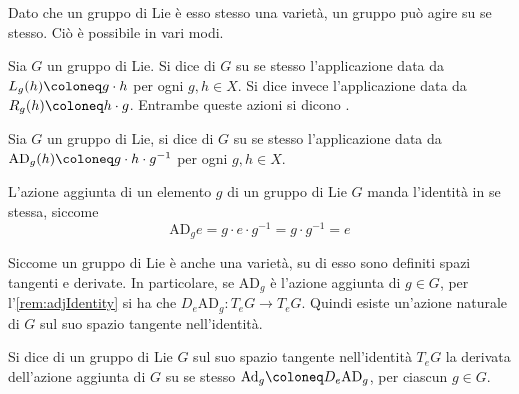 Dato che un gruppo di Lie è esso stesso una varietà, un gruppo può agire su se stesso. Ciò è possibile in vari modi.

\begin{definition}
  Sia $G$ un gruppo di Lie. Si dice  di $G$ su se stesso l'applicazione data da $L_g(h) \defeq g \cdot h$ per ogni $g,h \in X$. Si dice invece  l'applicazione data da $R_g(h) \defeq h \cdot g$. Entrambe queste azioni si dicono .
\end{definition}
\begin{definition}
  Sia $G$ un gruppo di Lie, si dice  di $G$ su se stesso l'applicazione data da $\mathrm{AD}_g(h) \defeq g \cdot h \cdot g^{-1}$ per ogni $g,h \in X$.
\end{definition}
\begin{remark} \label{rem:adjIdentity}
  L'azione aggiunta di un elemento $g$ di un gruppo di Lie $G$ manda l'identità in se stessa, siccome \begin{equation}
    \mathrm{AD}_g e = g\cdot e\cdot g^{-1} = g\cdot g^{-1} = e
  \end{equation} 
\end{remark}

Siccome un gruppo di Lie è anche una varietà, su di esso sono definiti spazi tangenti e derivate. In particolare, se $\mathrm{AD}_g$ è l'azione aggiunta di $g \in G$, per l'\autoref{rem:adjIdentity} si ha che $D_e \mathrm{AD}_g: T_e G \to T_e G$. Quindi esiste un'azione naturale di $G$ sul suo spazio tangente nell'identità.
\begin{definition}
  Si dice  di un gruppo di Lie $G$ sul suo spazio tangente nell'identità $T_e G$ la derivata dell'azione aggiunta di $G$ su se stesso $\mathrm{Ad}_g \defeq D_e \mathrm{AD}_g$, per ciascun $g \in G$. 
\end{definition}

